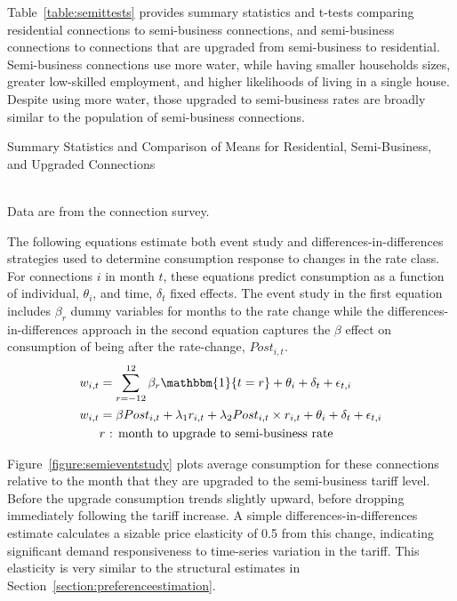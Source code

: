 \documentclass[12pt]{article}
\begin{document}
\begin{appendices}
Table~\ref{table:semittests} provides summary statistics and t-tests comparing residential connections to semi-business connections, and semi-business connections to connections that are upgraded from semi-business to residential.  Semi-business connections use more water, while having smaller households sizes, greater low-skilled employment, and higher likelihoods of living in a single house.  Despite using more water, those upgraded to semi-business rates are broadly similar to the population of semi-business connections.  

\begin{table}
\centering
\caption{Summary Statistics and Comparison of Means for Residential, Semi-Business, and Upgraded Connections}\label{table:semittests}
\resizebox{\textwidth}{!}{  

}\\
\footnotesize{Data are from the connection survey.}
\end{table}

The following equations estimate both event study and differences-in-differences strategies used to determine consumption response to changes in the rate class.  For connections $i$ in month $t$, these equations predict consumption as a function of individual, $\theta_i$, and time, $\delta_t$ fixed effects.  The event study in the first equation includes $\beta_r$ dummy variables for months to the rate change while the differences-in-differences approach in the second equation captures the $\beta$ effect on consumption of being after the rate-change, $Post_{i,t}$.
\begin{align*}
w_{i,t} &= \sum_{r=-12}^{12} \beta_{r} \mathbbm{1} \{t=r\}  +  \theta_{i} +\delta_t + \epsilon_{t,i} \\
w_{i,t} &= \beta Post_{i,t} +  \lambda_{1} r_{i,t} + \lambda_{2} Post_{i,t} \times r_{i,t} + \theta_{i} +\delta_t  + \epsilon_{t,i}\\
&r \text{ : month to upgrade to semi-business rate}
\end{align*}

Figure~\ref{figure:semieventstudy} plots average consumption for these connections relative to the month that they are upgraded to the semi-business tariff level.  Before the upgrade consumption trends slightly upward, before dropping immediately following the tariff increase.  A simple differences-in-differences estimate calculates a sizable price elasticity of 0.5 from this change, indicating significant demand responsiveness to time-series variation in the tariff.  This elasticity is very similar to the structural estimates in Section~\ref{section:preferenceestimation}.


\end{appendices}
\end{document}
